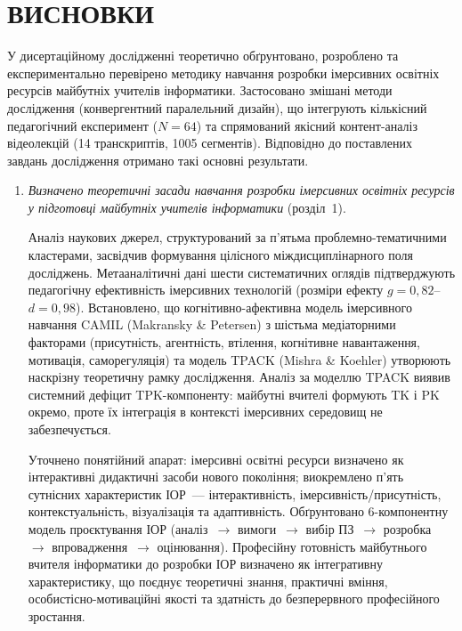 \section*{\centering ВИСНОВКИ}

У дисертаційному дослідженні теоретично обґрунтовано, розроблено та експериментально перевірено методику навчання розробки імерсивних освітніх ресурсів майбутніх учителів інформатики. Застосовано змішані методи дослідження (конвергентний паралельний дизайн), що інтегрують кількісний педагогічний експеримент ($N = 64$) та спрямований якісний контент-аналіз відеолекцій (14 транскриптів, 1005 сегментів). Відповідно до поставлених завдань дослідження отримано такі основні результати.

\begin{enumerate}

\item \textit{Визначено теоретичні засади навчання розробки імерсивних освітніх ресурсів у підготовці майбутніх учителів інформатики} (розділ~1).

Аналіз наукових джерел, структурований за п'ятьма проблемно-тематичними кластерами, засвідчив формування цілісного міждисциплінарного поля досліджень. Метааналітичні дані шести систематичних оглядів підтверджують педагогічну ефективність імерсивних технологій (розміри ефекту $g=0{,}82$--$d=0{,}98$). Встановлено, що когнітивно-афективна модель імерсивного навчання CAMIL (Makransky \& Petersen) з шістьма медіаторними факторами (присутність, агентність, втілення, когнітивне навантаження, мотивація, саморегуляція) та модель TPACK (Mishra \& Koehler) утворюють наскрізну теоретичну рамку дослідження. Аналіз за моделлю TPACK виявив системний дефіцит TPK-компоненту: майбутні вчителі формують TK і PK окремо, проте їх інтеграція в контексті імерсивних середовищ не забезпечується.

Уточнено понятійний апарат: імерсивні освітні ресурси визначено як інтерактивні дидактичні засоби нового покоління; виокремлено п'ять сутнісних характеристик ІОР~--- інтерактивність, імерсивність/присутність, контекстуальність, візуалізація та адаптивність. Обґрунтовано 6-компонентну модель проєктування ІОР (аналіз~$\to$ вимоги~$\to$ вибір ПЗ~$\to$ розробка~$\to$ впровадження~$\to$ оцінювання). Професійну готовність майбутнього вчителя інформатики до розробки ІОР визначено як інтегративну характеристику, що поєднує теоретичні знання, практичні вміння, особистісно-мотиваційні якості та здатність до безперервного професійного зростання.


\end{enumerate}
